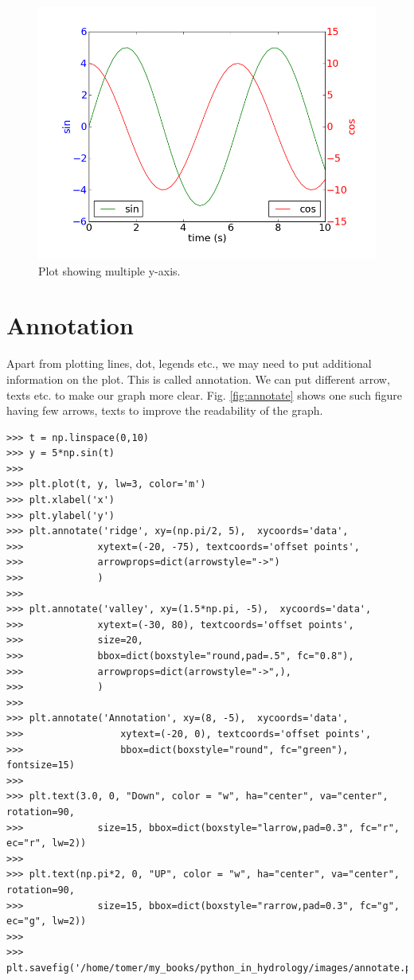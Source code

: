 \documentclass[10pt]{book}
\begin{document}
{\beforefig
\begin{figure}[h!]
  \centering
    \includegraphics[scale=0.5]{images/multiple_y.png}
  \caption{Plot showing multiple y-axis.}
   \label{fig:multi_y}
\end{figure}
\afterfig

\section{Annotation}
Apart from plotting lines, dot, legends etc., we may need to put additional information on the plot. This is called annotation. We can put different arrow, texts etc. to make our graph more clear. Fig. \ref{fig:annotate} shows one such figure having few arrows, texts to improve the readability of the graph. 
\beforeverb \begin{verbatim}
>>> t = np.linspace(0,10)
>>> y = 5*np.sin(t)
>>> 
>>> plt.plot(t, y, lw=3, color='m')
>>> plt.xlabel('x')
>>> plt.ylabel('y')
>>> plt.annotate('ridge', xy=(np.pi/2, 5),  xycoords='data',
>>>             xytext=(-20, -75), textcoords='offset points',
>>>             arrowprops=dict(arrowstyle="->")
>>>             )
>>> 
>>> plt.annotate('valley', xy=(1.5*np.pi, -5),  xycoords='data',
>>>             xytext=(-30, 80), textcoords='offset points',
>>>             size=20,
>>>             bbox=dict(boxstyle="round,pad=.5", fc="0.8"),
>>>             arrowprops=dict(arrowstyle="->",),
>>>             )
>>> 
>>> plt.annotate('Annotation', xy=(8, -5),  xycoords='data',
>>>                 xytext=(-20, 0), textcoords='offset points',
>>>                 bbox=dict(boxstyle="round", fc="green"), fontsize=15)
>>> 
>>> plt.text(3.0, 0, "Down", color = "w", ha="center", va="center", rotation=90,
>>>             size=15, bbox=dict(boxstyle="larrow,pad=0.3", fc="r", ec="r", lw=2))
>>> 
>>> plt.text(np.pi*2, 0, "UP", color = "w", ha="center", va="center", rotation=90,
>>>             size=15, bbox=dict(boxstyle="rarrow,pad=0.3", fc="g", ec="g", lw=2))
>>> 
>>> plt.savefig('/home/tomer/my_books/python_in_hydrology/images/annotate.png')
\end{verbatim} \afterverb

}
\end{document}
